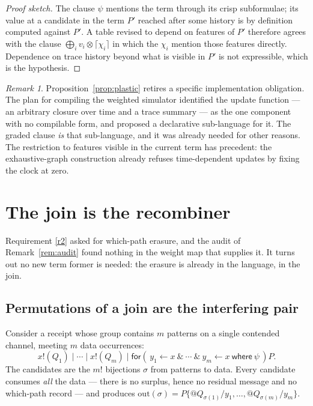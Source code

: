 \documentclass[11pt,a4paper]{article}
\theoremstyle{plain}
\theoremstyle{definition}
\theoremstyle{remark}
\newtheorem{remark}[theorem]{Remark}
\newcommand{\tensorv}{\otimes}
\newcommand{\Out}{\mathrm{out}}
\newcommand{\crisp}[1]{\lceil #1 \rceil}
\begin{document}
\begin{proof}[Proof sketch]
The clause $\psi$ mentions the term through its crisp subformulae; its value at
a candidate in the term $P'$ reached after some history is by definition computed
against $P'$. A table revised to depend on features of $P'$ therefore agrees with
the clause $\bigoplus_i v_i \tensorv \crisp{\chi_i}$ in which the $\chi_i$
mention those features directly. Dependence on trace history beyond what is
visible in $P'$ is not expressible, which is the hypothesis.
\end{proof}

\begin{remark}
Proposition~\ref{prop:plastic} retires a specific implementation obligation. The
plan for compiling the weighted simulator identified the update function --- an
arbitrary closure over time and a trace summary --- as the one component with no
compilable form, and proposed a declarative sub-language for it. The graded
clause \emph{is} that sub-language, and it was already needed for other reasons.
The restriction to features visible in the current term has precedent: the
exhaustive-graph construction already refuses time-dependent updates by fixing
the clock at zero.
\end{remark}

\section{The join is the recombiner}\label{sec:erasure}

Requirement \ref{r2} asked for which-path erasure, and the audit of
Remark~\ref{rem:audit} found nothing in the weight map that supplies it. It turns
out no new term former is needed: the erasure is already in the language, in the
join.

\subsection{Permutations of a join are the interfering pair}

Consider a receipt whose group contains $m$ patterns on a single contended
channel, meeting $m$ data occurrences:
\[
  x!(Q_1) \mid \cdots \mid x!(Q_m) \mid
  \textsf{for}(\,y_1 \leftarrow x\ \&\ \cdots\ \&\ y_m \leftarrow x
  \ \textsf{where}\ \psi\,)P .
\]
The candidates are the $m!$ bijections $\sigma$ from patterns to data. Every
candidate consumes \emph{all} the data --- there is no surplus, hence no residual
message and no which-path record --- and produces
$\Out(\sigma) = P\{@Q_{\sigma(1)}/y_1,\dots,@Q_{\sigma(m)}/y_m\}$.
\end{document}
